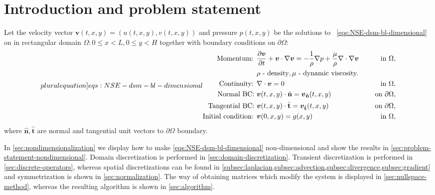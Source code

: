 \documentclass{article}
\numberwithin{equation}{section}
\begin{document}
\section{Introduction and problem statement}\label{sec:problem-statement-dimentional}
Let the velocity vector $\boldsymbol{v}(t,x,y)=(u(t,x,y),v(t,x,y))$ and pressure $p(t,x,y)$ be the solutions to ~\cref{eqs:NSE-dsm-bl-dimensional} on in rectangular domain $\Omega:0\leq x < L, 0\leq y < H$ together with boundary conditions on $\partial\Omega$:
\begin{subequations}
\label[pluralequation]{eqs:NSE-dsm-bl-dimensional}
\begin{align}
\label{eqn:momentum-dimensional}
\text{Momentum: }	&\frac{\partial \boldsymbol{v}}{\partial t} + \boldsymbol{v} \cdot \nabla \boldsymbol{v} = -\frac{1}{\rho}\nabla p + {\frac{\mu}{\rho}} \nabla \cdot \nabla \boldsymbol{v}\quad&\text{ in }\Omega,\\
&\rho\text{ - density}, \mu\text{ - dynamic viscosity.}\notag\\
\label{eqn:continuity-dsm-bl}
\text{Continuity: }	& \nabla \cdot \boldsymbol{v} = 0\quad&\text{ in }\Omega, \\ 
\label{eqn:NSE-bc-normal-dimensional}
\text{Normal BC: } & \boldsymbol{v}(t,x,y)\cdot\hat{\mathbf{n}}=\boldsymbol{v}_\mathbf{\hat{n}}(t,x,y) \quad&\text{ on }\partial\Omega, \\
\label{eqn:NSE-bc-tangential-dimensional}
\text{Tangential BC: } & \boldsymbol{v}(t,x,y)\cdot\hat{\mathbf{t}}=\boldsymbol{v}_\mathbf{\hat{t}}(t,x,y) \quad&\text{ on }\partial\Omega, \\
\label{eqn:NSE-ic-dimensional}
\text{Initial condition: } &\boldsymbol{v}(0,x,y)=g(x,y) \quad&\text{ in }\Omega,
\end{align}
\end{subequations}
where $\hat{\mathbf{n}},\hat{\mathbf{t}}$ are normal and tangential unit vectors to $\partial\Omega$ boundary.

In \cref{sec:nondimensionalization} we display how to make \cref{eqs:NSE-dsm-bl-dimensional} non-dimensional and show the results in \cref{sec:problem-statement-nondimensional}. Domain discretization is performed in \cref{sec:domain-discretization}. Transient discretization is performed in \cref{sec:discrete-operators}, whereas spatial discretizations can be found in \cref{subsec:laplacian,subsec:advection,subsec:divergence,subsec:gradient} and symmetrization is shown in \cref{sec:normalization}. The way of obtaining matrices which modify the system is displayed in \cref{sec:nullspace-method}, whereas the resulting algorithm is shown in \cref{sec:algorithm}.
\end{document}

